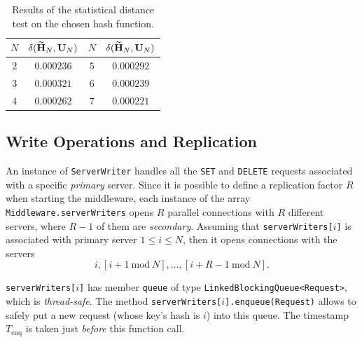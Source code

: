 \documentclass[11pt]{article}
\theoremstyle{definition}
\newcommand\Tenq{T_{\mathrm{enq}}}
\renewcommand\b[1]{{\bf{#1}}}
\renewcommand\t\texttt
\newcommand\md[2]{\left[#1\mathrm{\ mod\ }#2\right]}
\begin{document}
\begin{table}[h]
    \centering
    \small
    {
        \smallskip
        \begin{tabular}{|c|c||c|c|}
            \hline
            $N$ & $\delta(\widetilde\b H_N,\b U_N)$ & $N$ & $\delta(\widetilde\b H_N,\b U_N)$ \\
            \hline
            \hline
            $2$ & $0.000236$ & $5$ & $0.000292$ \\ 
            $3$ & $0.000321$ & $6$ & $0.000239$ \\  
            $4$ & $0.000262$ & $7$ & $0.000221$ \\ 
            \hline 
        \end{tabular}
    }
    \caption{Results of the statistical distance test on the chosen hash function.}
    \label{tab:hash}
\end{table}

\subsection{Write Operations and Replication}\label{sec:desc:writes}

An instance of \t{ServerWriter} handles all the \t{SET} and \t{DELETE} requests associated with a specific \emph{primary} server.
Since it is possible to define a replication factor $R$ when starting the middleware, each instance of the array \t{Middleware.serverWriters} opens $R$ parallel connections with $R$ different servers, where $R-1$ of them are \emph{secondary}.
Assuming that \t{serverWriters[$i$]} is associated with primary server $1\leq i\leq N$, then it opens connections with the servers
\[i,\md{i+1}N,\ldots,\md{i+R-1}N.\]

\t{serverWriters[$i$]} has member \t{queue} of type \t{LinkedBlockingQueue<Request>}, which is \emph{thread-safe}.
The method \t{serverWriters[$i$].enqueue(Request)} allows to safely put a new request (whose key's hash is $i$) into this queue.
The timestamp $\Tenq$ is taken just \emph{before} this function call.
\end{document}
